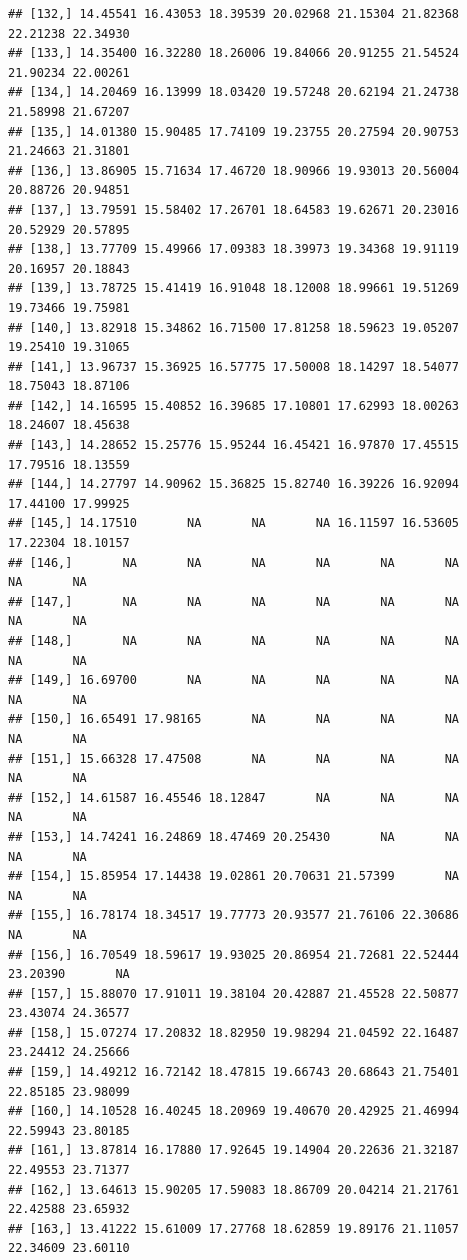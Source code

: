 \documentclass{article}\usepackage[]{graphicx}\usepackage[]{color}
\makeatletter
\newenvironment{kframe}{%
 \def\at@end@of@kframe{}%
 \ifinner\ifhmode%
  \def\at@end@of@kframe{\end{minipage}}%
  \begin{minipage}{\columnwidth}%
 \fi\fi%
 \def\FrameCommand##1{\hskip\@totalleftmargin \hskip-\fboxsep
 \colorbox{shadecolor}{##1}\hskip-\fboxsep
     \hskip-\linewidth \hskip-\@totalleftmargin \hskip\columnwidth}%
 \MakeFramed {\advance\hsize-\width
   \@totalleftmargin\z@ \linewidth\hsize
   \@setminipage}}%
 {\par\unskip\endMakeFramed%
 \at@end@of@kframe}
\newenvironment{knitrout}{}{} %
\makeatother
\begin{document}
\begin{knitrout}
\begin{kframe}
\begin{verbatim}
## [132,] 14.45541 16.43053 18.39539 20.02968 21.15304 21.82368 22.21238 22.34930
## [133,] 14.35400 16.32280 18.26006 19.84066 20.91255 21.54524 21.90234 22.00261
## [134,] 14.20469 16.13999 18.03420 19.57248 20.62194 21.24738 21.58998 21.67207
## [135,] 14.01380 15.90485 17.74109 19.23755 20.27594 20.90753 21.24663 21.31801
## [136,] 13.86905 15.71634 17.46720 18.90966 19.93013 20.56004 20.88726 20.94851
## [137,] 13.79591 15.58402 17.26701 18.64583 19.62671 20.23016 20.52929 20.57895
## [138,] 13.77709 15.49966 17.09383 18.39973 19.34368 19.91119 20.16957 20.18843
## [139,] 13.78725 15.41419 16.91048 18.12008 18.99661 19.51269 19.73466 19.75981
## [140,] 13.82918 15.34862 16.71500 17.81258 18.59623 19.05207 19.25410 19.31065
## [141,] 13.96737 15.36925 16.57775 17.50008 18.14297 18.54077 18.75043 18.87106
## [142,] 14.16595 15.40852 16.39685 17.10801 17.62993 18.00263 18.24607 18.45638
## [143,] 14.28652 15.25776 15.95244 16.45421 16.97870 17.45515 17.79516 18.13559
## [144,] 14.27797 14.90962 15.36825 15.82740 16.39226 16.92094 17.44100 17.99925
## [145,] 14.17510       NA       NA       NA 16.11597 16.53605 17.22304 18.10157
## [146,]       NA       NA       NA       NA       NA       NA       NA       NA
## [147,]       NA       NA       NA       NA       NA       NA       NA       NA
## [148,]       NA       NA       NA       NA       NA       NA       NA       NA
## [149,] 16.69700       NA       NA       NA       NA       NA       NA       NA
## [150,] 16.65491 17.98165       NA       NA       NA       NA       NA       NA
## [151,] 15.66328 17.47508       NA       NA       NA       NA       NA       NA
## [152,] 14.61587 16.45546 18.12847       NA       NA       NA       NA       NA
## [153,] 14.74241 16.24869 18.47469 20.25430       NA       NA       NA       NA
## [154,] 15.85954 17.14438 19.02861 20.70631 21.57399       NA       NA       NA
## [155,] 16.78174 18.34517 19.77773 20.93577 21.76106 22.30686       NA       NA
## [156,] 16.70549 18.59617 19.93025 20.86954 21.72681 22.52444 23.20390       NA
## [157,] 15.88070 17.91011 19.38104 20.42887 21.45528 22.50877 23.43074 24.36577
## [158,] 15.07274 17.20832 18.82950 19.98294 21.04592 22.16487 23.24412 24.25666
## [159,] 14.49212 16.72142 18.47815 19.66743 20.68643 21.75401 22.85185 23.98099
## [160,] 14.10528 16.40245 18.20969 19.40670 20.42925 21.46994 22.59943 23.80185
## [161,] 13.87814 16.17880 17.92645 19.14904 20.22636 21.32187 22.49553 23.71377
## [162,] 13.64613 15.90205 17.59083 18.86709 20.04214 21.21761 22.42588 23.65932
## [163,] 13.41222 15.61009 17.27768 18.62859 19.89176 21.11057 22.34609 23.60110

\end{verbatim}
\end{kframe}
\end{knitrout}
\end{document}
